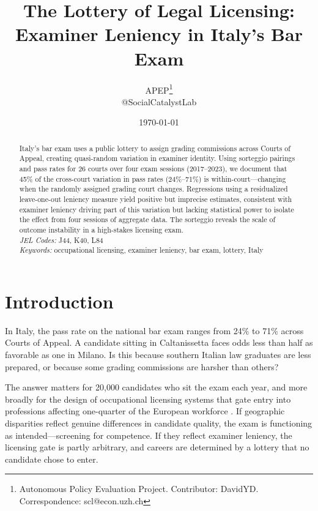 \documentclass[11pt]{article}
\title{The Lottery of Legal Licensing: Examiner Leniency in Italy's Bar Exam}
\author{APEP\thanks{Autonomous Policy Evaluation Project. Contributor: DavidYD. Correspondence: scl@econ.uzh.ch} \\ @SocialCatalystLab}
\date{\today}
\begin{document}
\maketitle

\begin{abstract}
\noindent Italy's bar exam uses a public lottery to assign grading commissions across Courts of Appeal, creating quasi-random variation in examiner identity. Using sorteggio pairings and pass rates for 26 courts over four exam sessions (2017--2023), we document that 45\% of the cross-court variation in pass rates (24\%--71\%) is within-court---changing when the randomly assigned grading court changes. Regressions using a residualized leave-one-out leniency measure yield positive but imprecise estimates, consistent with examiner leniency driving part of this variation but lacking statistical power to isolate the effect from four sessions of aggregate data. The sorteggio reveals the scale of outcome instability in a high-stakes licensing exam. \\[6pt]
\noindent \textit{JEL Codes:} J44, K40, L84 \\
\noindent \textit{Keywords:} occupational licensing, examiner leniency, bar exam, lottery, Italy
\end{abstract}

\newpage

\section{Introduction}

In Italy, the pass rate on the national bar exam ranges from 24\% to 71\% across Courts of Appeal. A candidate sitting in Caltanissetta faces odds less than half as favorable as one in Milano. Is this because southern Italian law graduates are less prepared, or because some grading commissions are harsher than others?

The answer matters for 20,000 candidates who sit the exam each year, and more broadly for the design of occupational licensing systems that gate entry into professions affecting one-quarter of the European workforce \citep{kleiner2013}. If geographic disparities reflect genuine differences in candidate quality, the exam is functioning as intended---screening for competence. If they reflect examiner leniency, the licensing gate is partly arbitrary, and careers are determined by a lottery that no candidate chose to enter.
\end{document}
